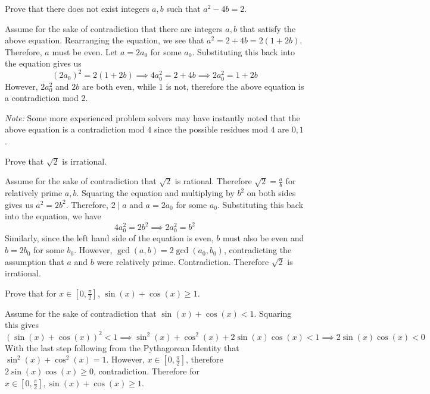 \begin{exmp}  Prove that there does not exist integers $a,b$ such that $a^2-4b=2$.  \end{exmp}
\begin{soln}  Assume for the sake of contradiction that there are integers $a,b$ that satisfy the above equation.  Rearranging the equation, we see that $a^2=2+4b=2(1+2b)$.  Therefore, $a$ must be even.  Let $a=2a_0$ for some $a_0$.  Substituting this back into the equation gives us $$(2a_0)^2=2(1+2b)\implies 4a_0^2=2+4b\implies 2a_0^2=1+2b$$
However, $2a_0^2$ and $2b$ are both even, while $1$ is not, therefore the above equation is a contradiction mod $2$.  

\textit{Note:}  Some more experienced problem solvers may have instantly noted that the above equation is a contradiction mod $4$ since the possible residues mod $4$ are $0,1$.  
\end{soln}

\begin{exmp}  Prove that $\sqrt{2}$ is irrational.  \end{exmp}
\begin{soln}  Assume for the sake of contradiction that $\sqrt{2}$ is rational.  Therefore $\sqrt{2}=\frac{a}{b}$ for relatively prime $a,b$.  Squaring the equation and multiplying by $b^2$ on both sides gives us $a^2=2b^2$.  Therefore, $2\mid a$ and $a=2a_0$ for some $a_0$.  Substituting this back into the equation, we have $$4a_0^2=2b^2\implies 2a_0^2=b^2$$  Similarly, since the left hand side of the equation is even, $b$ must also be even and $b=2b_0$ for some $b_0$.  However, $\gcd(a,b)=2\gcd(a_0, b_0)$, contradicting the assumption that $a$ and $b$ were relatively prime.  Contradiction.  Therefore $\sqrt{2}$ is irrational.  \end{soln}

\begin{exmp}  Prove that for $x\in [0, \frac{\pi}{2}]$, $\sin(x)+\cos(x)\ge 1$.  \end{exmp}
\begin{soln}  Assume for the sake of contradiction that $\sin(x)+\cos(x)<1$.  Squaring this gives $$\left(\sin(x)+\cos(x)\right)^2<1\implies \sin^2(x)+\cos^2(x)+2\sin(x)\cos(x)<1\implies 2\sin(x)\cos(x)<0$$
With the last step following from the Pythagorean Identity that $\sin^2(x)+\cos^2(x)=1$.  However, $x\in [0, \frac{\pi}{2}]$, therefore $2\sin(x)\cos(x)\ge 0$, contradiction.  Therefore for $x\in [0, \frac{\pi}{2}], \sin(x)+\cos(x)\ge 1$.  \end{soln}  

